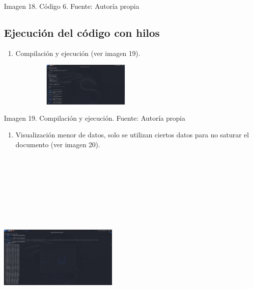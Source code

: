 Imagen 18. Código 6. Fuente: Autoría propia

\subsection{Ejecución del código con hilos}\label{ejecuciuxf3n-del-cuxf3digo-con-hilos}

\begin{enumerate} \def\labelenumi{\arabic{enumi}.} \item   Compilación y ejecución (ver imagen 19). \end{enumerate}

\includegraphics[width=3.46875in,height=0.8384in]{media/image36.png}

Imagen 19. Compilación y ejecución. Fuente: Autoría propia

\begin{enumerate} \def\labelenumi{\arabic{enumi}.} \setcounter{enumi}{1} \item   Visualización menor de datos, solo se utilizan ciertos datos para no   saturar el documento (ver imagen 20). \end{enumerate}

\includegraphics[width=2.29583in,height=4.29598in]{media/image35.png}

